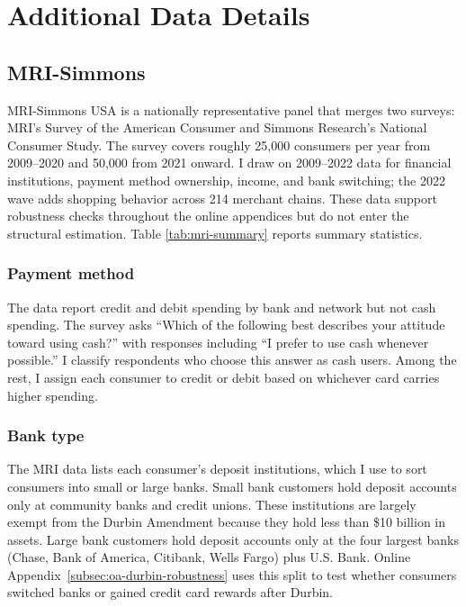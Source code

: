 \documentclass[main.tex]{subfiles}
\begin{document}
\section{Additional Data Details}
\label{sec:oa-data-additional}

\subsection{MRI-Simmons}\label{sec:oa-data}

MRI-Simmons USA is a nationally representative panel that merges two surveys: MRI's Survey of the American Consumer and Simmons Research's National Consumer Study.
The survey covers roughly 25,000 consumers per year from 2009--2020 and 50,000 from 2021 onward.
I draw on 2009--2022 data for financial institutions, payment method ownership, income, and bank switching; the 2022 wave adds shopping behavior across 214 merchant chains.
These data support robustness checks throughout the online appendices but do not enter the structural estimation.
Table \ref{tab:mri-summary} reports summary statistics.

\subsubsection{Payment method}

The data report credit and debit spending by bank and network but not cash spending.
The survey asks ``Which of the following best describes your attitude toward using cash?'' with responses including ``I prefer to use cash whenever possible.''
I classify respondents who choose this answer as cash users.
Among the rest, I assign each consumer to credit or debit based on whichever card carries higher spending.

\subsubsection{Bank type}\label{subsubsec:oa-mri-bank-type}

The MRI data lists each consumer's deposit institutions, which I use to sort consumers into small or large banks.
Small bank customers hold deposit accounts only at community banks and credit unions. These institutions are largely exempt from the Durbin Amendment because they hold less than \$10 billion in assets.
Large bank customers hold deposit accounts only at the four largest banks (Chase, Bank of America, Citibank, Wells Fargo) plus U.S. Bank.
Online Appendix~\ref{subsec:oa-durbin-robustness} uses this split to test whether consumers switched banks or gained credit card rewards after Durbin.
\end{document}
